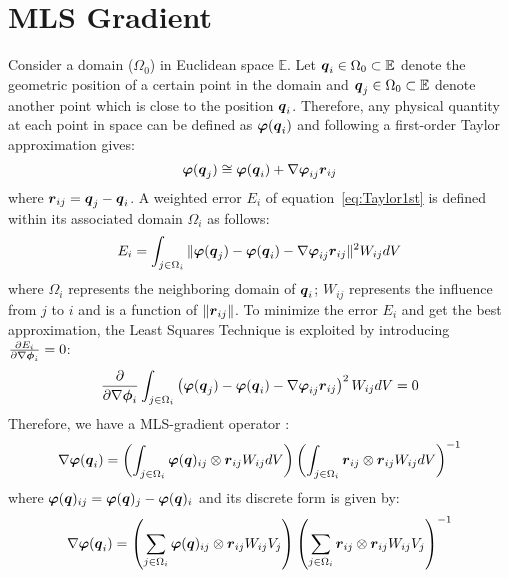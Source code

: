 \appendix
\label{sec:appendix}
\section{MLS Gradient}
\label{sec:mls_gradient}
Consider a domain {($\Omega_0$)} in Euclidean space $\mathbb{E}$. Let $\boldsymbol{q}_i\in \Omega_{0} \subset \mathbb{E}$ denote the geometric position of a certain point in the domain and $\boldsymbol{q}_j\in \Omega_{0} \subset \mathbb{E}$ denote another point which is close to the position $\boldsymbol{q}_i$.
Therefore, any physical quantity at each point in space can be defined as $\boldsymbol{\varphi}(\boldsymbol{q}_i)$ and following a first-order Taylor approximation gives: 
\begin{equation}
\boldsymbol{\varphi}(\boldsymbol{q}_j)\cong \boldsymbol{\varphi}(\boldsymbol{q}_i) +\nabla{\boldsymbol{\varphi}}_{ij} \boldsymbol{r}_{ij}
\label{eq:Taylor1st}
\end{equation}
where $\boldsymbol{r}_{ij}=\boldsymbol{q}_j-\boldsymbol{q}_i$. A weighted error $E_i$ of equation~\eqref{eq:Taylor1st} is defined within its associated domain $\Omega_i$ as follows:
\begin{equation}
E_i=\int_{j\in\Omega_i}\|{\boldsymbol{\varphi}(\boldsymbol{q}_j)-\boldsymbol{\varphi}(\boldsymbol{q}_i)}-\nabla{\boldsymbol{\varphi}_{ij}} \boldsymbol{r}_{ij}\|^2W_{ij}dV
\label{eq:error_i}
\end{equation}
where $\Omega_i$ represents the neighboring domain of $\boldsymbol{q}_i$; $W_{ij}$ represents the influence from $j$ to $i$ and is a function of $\left\|\boldsymbol{r}_{ij}\right\|$. To minimize the error $E_i$ and get the best approximation, the Least Squares Technique is exploited by introducing $\frac{\partial E_i}{\partial \nabla \boldsymbol{\phi}_i}=0$:
\begin{equation}
\frac{\partial}{\partial\nabla \boldsymbol{\phi}_i}\int_{j\in\Omega_i}\left({\boldsymbol{\varphi}(\boldsymbol{q}_j)-\boldsymbol{\varphi}(\boldsymbol{q}_i)}-\nabla{\boldsymbol{\varphi}_{ij}} \boldsymbol{r}_{ij}\right)^2W_{ij}dV=0 
\end{equation}
Therefore, we have a MLS-gradient operator : 
\begin{eqnarray}
\nabla\boldsymbol{\varphi}(\boldsymbol{q}_i)=\left(\int_{j\in\Omega_i}\boldsymbol{\varphi}(\boldsymbol{q})_{ij}\otimes \boldsymbol{r}_{ij} W_{ij} dV\right)\left(\int_{j\in\Omega_i}\boldsymbol{r}_{ij}\otimes\boldsymbol{r}_{ij} W_{ij} dV \right)^{-1}
\label{eq:gradient_int}
\end{eqnarray}
where $\boldsymbol{\varphi}(\boldsymbol{q})_{ij}=\boldsymbol{\varphi}(\boldsymbol{q})_{j}-\boldsymbol{\varphi}(\boldsymbol{q})_{i}$
and its discrete form is given by:
\begin{eqnarray}
\nabla\boldsymbol{\varphi}(\boldsymbol{q}_i)=\left(\sum_{j\in\Omega_i}\boldsymbol{\varphi}(\boldsymbol{q})_{ij}\otimes \boldsymbol{r}_{ij} W_{ij} V_j\right)\left(\sum_{j\in\Omega_i}\boldsymbol{r}_{ij}\otimes\boldsymbol{r}_{ij} W_{ij} V_j \right)^{-1}
\label{eq:gradient_sum}
\end{eqnarray}
